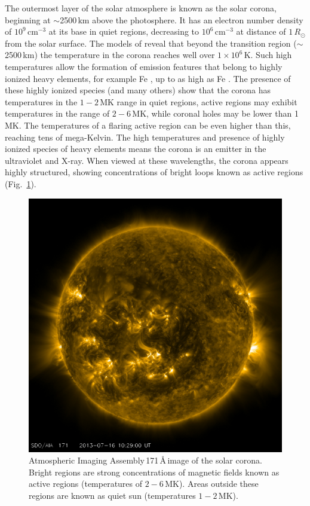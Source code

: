 The outermost layer of the solar atmosphere is known as the solar corona, beginning at $\sim$2500\,km above the photosphere. It has an electron number density of $10^{9}$\,cm$^{-3}$ at its base in quiet regions, decreasing to $10^{6}$\,cm$^{-3}$ at distance of $1\,R_{\odot}$ from the solar surface. The models of \citep{vernazza1981, fontenla1988, gabriel1976} reveal that beyond the transition region ($\sim$2500\,km) the temperature in the corona reaches well over $1\times10^{6}$\,K. Such high temperatures allow the formation of emission features that belong to highly ionized heavy elements, for example Fe , up to as high as Fe . The presence of these highly ionized species (and many others) show that the corona has temperatures in the $1-2$\,MK range in quiet regions, active regions may exhibit temperatures in the range of $2-6$\,MK, while coronal holes may be lower than 1\,MK. The temperatures of a flaring active region can be even higher than this, reaching tens of mega-Kelvin. The high temperatures and presence of highly ionized species of heavy elements means the corona is an emitter in the ultraviolet and X-ray. When viewed at these wavelengths, the corona appears highly structured, showing concentrations of bright loops known as active regions (Fig.~\ref{fig:aia171}).
\begin{figure}[!t]
\begin{center}
\includegraphics[scale=0.10]{images/aia_171}
\caption[171 Angstrom image of the corona]{Atmospheric Imaging Assembly\,171\,\AA\,image of the solar corona. Bright regions are strong concentrations of magnetic fields known as active regions (temperatures of $2-6$\,MK). Areas outside these regions are known as quiet sun (temperatures $1-2$\,MK).}
\label{fig:aia171} 
\end{center}
\end{figure}

